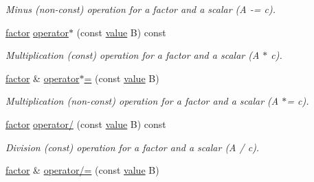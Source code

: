 \begin{DoxyCompactItemize}
\begin{DoxyCompactList}\small\item\em Minus (non-\/const) operation for a factor and a scalar (A -\/= c). \end{DoxyCompactList}\item 
\hypertarget{classmerlin_1_1factor_a9c20ee42212e6b606bda2f14f73bd607}{}\hyperlink{classmerlin_1_1factor}{factor} \hyperlink{classmerlin_1_1factor_a9c20ee42212e6b606bda2f14f73bd607}{operator$\ast$} (const \hyperlink{classmerlin_1_1factor_a1b14d19e509403448fbef26b003c9281}{value} B) const \label{classmerlin_1_1factor_a9c20ee42212e6b606bda2f14f73bd607}

\begin{DoxyCompactList}\small\item\em Multiplication (const) operation for a factor and a scalar (A $\ast$ c). \end{DoxyCompactList}\item 
\hypertarget{classmerlin_1_1factor_ae4ff5bee072a9969531828a515563597}{}\hyperlink{classmerlin_1_1factor}{factor} \& \hyperlink{classmerlin_1_1factor_ae4ff5bee072a9969531828a515563597}{operator$\ast$=} (const \hyperlink{classmerlin_1_1factor_a1b14d19e509403448fbef26b003c9281}{value} B)\label{classmerlin_1_1factor_ae4ff5bee072a9969531828a515563597}

\begin{DoxyCompactList}\small\item\em Multiplication (non-\/const) operation for a factor and a scalar (A $\ast$= c). \end{DoxyCompactList}\item 
\hypertarget{classmerlin_1_1factor_a9c3a4833e8505430666ff742ef5f1e26}{}\hyperlink{classmerlin_1_1factor}{factor} \hyperlink{classmerlin_1_1factor_a9c3a4833e8505430666ff742ef5f1e26}{operator/} (const \hyperlink{classmerlin_1_1factor_a1b14d19e509403448fbef26b003c9281}{value} B) const \label{classmerlin_1_1factor_a9c3a4833e8505430666ff742ef5f1e26}

\begin{DoxyCompactList}\small\item\em Division (const) operation for a factor and a scalar (A / c). \end{DoxyCompactList}\item 
\hypertarget{classmerlin_1_1factor_a7a9e85476966fa9efc6a6fd38dba6670}{}\hyperlink{classmerlin_1_1factor}{factor} \& \hyperlink{classmerlin_1_1factor_a7a9e85476966fa9efc6a6fd38dba6670}{operator/=} (const \hyperlink{classmerlin_1_1factor_a1b14d19e509403448fbef26b003c9281}{value} B)\label{classmerlin_1_1factor_a7a9e85476966fa9efc6a6fd38dba6670}


\end{DoxyCompactItemize}
